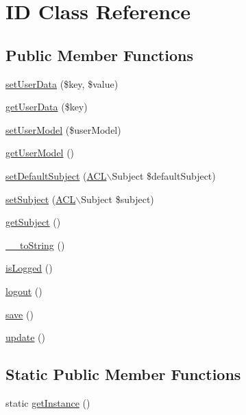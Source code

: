 \hypertarget{class_anemo_1_1_i_d}{
\section{ID Class Reference}
\label{class_anemo_1_1_i_d}
}
\subsection*{Public Member Functions}
\begin{DoxyCompactItemize}
\item 
\hyperlink{class_anemo_1_1_i_d_a96f600de7f4fe416bf8565d9d0eebee4}{setUserData} (\$key, \$value)
\item 
\hyperlink{class_anemo_1_1_i_d_ab62d4b3c3a14ab592768235dad6deb63}{getUserData} (\$key)
\item 
\hyperlink{class_anemo_1_1_i_d_acb1f072e530b91295d23a5ebdc6e53ff}{setUserModel} (\$userModel)
\item 
\hyperlink{class_anemo_1_1_i_d_a0a6d931d0dc4ccedf2c4600db053f8c9}{getUserModel} ()
\item 
\hyperlink{class_anemo_1_1_i_d_a2cd5bd9951ce5aa5ff432c289a40721b}{setDefaultSubject} (\hyperlink{class_anemo_1_1_a_c_l}{ACL}$\backslash$Subject \$defaultSubject)
\item 
\hyperlink{class_anemo_1_1_i_d_abc6977501353993a25964aa590a1c9c1}{setSubject} (\hyperlink{class_anemo_1_1_a_c_l}{ACL}$\backslash$Subject \$subject)
\item 
\hyperlink{class_anemo_1_1_i_d_a7ec8f5b794ded8f3c0df9afd96c8233c}{getSubject} ()
\item 
\hyperlink{class_anemo_1_1_i_d_a7516ca30af0db3cdbf9a7739b48ce91d}{\_\-\_\-toString} ()
\item 
\hyperlink{class_anemo_1_1_i_d_a2e5051c30251e26c6da72ea9cfbe864f}{isLogged} ()
\item 
\hyperlink{class_anemo_1_1_i_d_a082405d89acd6835c3a7c7a08a7adbab}{logout} ()
\item 
\hyperlink{class_anemo_1_1_i_d_afc8a3c62679cf00ade9f15fb2a6d6132}{save} ()
\item 
\hyperlink{class_anemo_1_1_i_d_a842e4774e3b3601a005b995c02f7e883}{update} ()
\end{DoxyCompactItemize}
\subsection*{Static Public Member Functions}
\begin{DoxyCompactItemize}
\item 
static \hyperlink{class_anemo_1_1_i_d_ac93fbec81f07e5d15f80db907e63dc10}{getInstance} ()
\end{DoxyCompactItemize}
